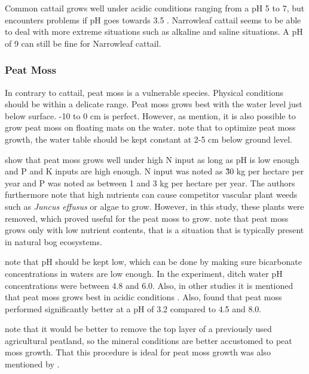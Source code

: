 \documentclass[12pt,a4paper,titlepage]{article}
\begin{document}
Common cattail grows well under acidic conditions ranging from a pH 5 to 7, but encounters problems if pH goes towards 3.5 \citep{brix2002typha}. Narrowleaf cattail seems to be able to deal with more extreme situations such as alkaline and saline situations. A pH of 9 can still be fine for Narrowleaf cattail.





\subsubsection{Peat Moss}

In contrary to cattail, peat moss is a vulnerable species. Physical conditions should be within a delicate range. Peat moss grows best with the water level just below surface. -10 to 0 cm is perfect. However, as \citet{gaudig2014sphagnum} mention, it is also possible to grow peat moss on floating mats on the water. \citet{fritz2014paludicultuur} note that to optimize peat moss growth, the water table should be kept constant at 2-5 cm below ground level. 

\citet{Temmink2017196} show that peat moss grows well under high N input as long as pH is low enough and P and K inputs are high enough. N input was noted as \~ 30 kg per hectare per year and P was noted as between 1 and 3 kg per hectare per year. The authors furthermore note that high nutrients can cause competitor vascular plant weeds such as \textit{Juncus effusus} or algae to grow. However, in this study, these plants were removed, which proved useful for the peat moss to grow. \citep{wichtmann2016paludiculture} note that peat moss grows only with low nutrient contents, that is a situation that is typically present in natural bog ecosystems.


\citet{Temmink2017196} note that pH should be kept low, which can be done by making sure bicarbonate concentrations in waters are low enough. In the experiment, ditch water pH concentrations were between 4.8 and 6.0. Also, in other studies it is mentioned that peat moss grows best in acidic conditions \citep{wichtmann2016paludiculture}. Also, \citet{gaudig2005growing} found that peat moss performed significantly better at a pH of 3.2 compared to 4.5 and 8.0. 

\citet{fritz2014paludicultuur} note that it would be better to remove the top layer of a previously used agricultural peatland, so the mineral conditions are better accustomed to peat moss growth. That this procedure is ideal for peat moss growth was also mentioned by \citet{Temmink2017196}.
\end{document}
